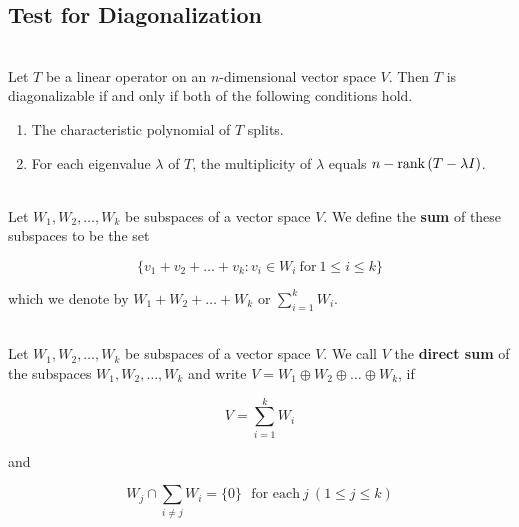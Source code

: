 \subsection*{Test for Diagonalization}

\begin{remark}
	\hfill\\
	Let $T$ be a linear operator on an $n$-dimensional vector space $V$. Then $T$ is diagonalizable if and only if both of the following conditions hold.

	\begin{enumerate}
		\item The characteristic polynomial of $T$ splits.
		\item For each eigenvalue $\lambda$ of $T$, the multiplicity of $\lambda$ equals $n - \text{rank}\left(T - \lambda I\right)$.
	\end{enumerate}
\end{remark}

\begin{definition}
	\hfill\\
	Let $W_1, W_2, \dots, W_k$ be subspaces of a vector space $V$. We define the \textbf{sum} of these subspaces to be the set

	\[\{v_1 + v_2 + \dots + v_k : v_i \in W_i\ \text{for}\ 1 \leq i \leq k\}\]

	which we denote by $W_1 + W_2 + \dots + W_k$ or $\displaystyle\sum_{i=1}^{k}W_i$.
\end{definition}

\begin{definition}
	\hfill\\
	Let $W_1, W_2, \dots, W_k$ be subspaces of a vector space $V$. We call $V$ the \textbf{direct sum} of the subspaces $W_1, W_2, \dots, W_k$ and write $V = W_1 \oplus W_2 \oplus \dots \oplus W_k$, if

	\[V = \sum_{i=1}^{k}W_i\]

	and

	\[W_j \cap \sum_{i \neq j} W_i = \{0\}\ \ \ \text{for each}\ j\ (1 \leq j \leq k)\]
\end{definition}

